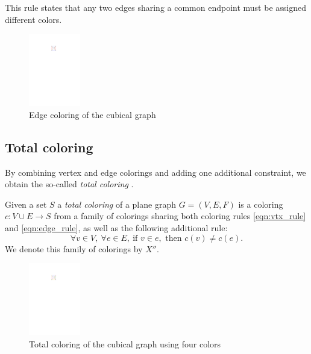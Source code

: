 This rule states that any two edges sharing a common endpoint must be assigned different colors.

\begin{figure}[H]
    \centering
    \includegraphics[width=0.2\textwidth]{../Resources/Figs/cubical_edg_colr.pdf}
    \caption{Edge coloring of the cubical graph}
    \label{fig:cubical_edge_coloring}
\end{figure}



\subsection{Total coloring}

By combining vertex and edge colorings and adding one additional constraint, we obtain the so-called \textit{total coloring} \cite{behzad65}.

\begin{defn}
    Given a set $S$ a \emph{total coloring} of a plane graph $G = (V, E, F)$ is a coloring $c : V \cup E \rightarrow S$ from a family of colorings sharing both coloring rules \ref{eqn:vtx_rule} and \ref{eqn:edge_rule}, as well as the following additional rule:
    \begin{equation}\label{eqn:tot_rule}
    \forall v \in V, \ \forall e \in E, \ \text{if } v \in e, \text{ then } c(v) \neq c(e). \tag{$R_T$}
    \end{equation}
    We denote this family of colorings by $X''$.
\end{defn}

\begin{figure}[H]
    \centering
    \includegraphics[width=0.2\textwidth]{../Resources/Figs/cubical_tot_colr_opt.pdf}
    \caption{Total coloring of the cubical graph using four colors}
    \label{fig:cubical_tot_coloring}
\end{figure}

